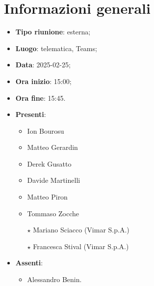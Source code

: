 \section{Informazioni generali}
\begin{itemize}
  \item \textbf{Tipo riunione}: esterna;
  \item \textbf{Luogo}: telematica, Teams;
  \item \textbf{Data}: 2025-02-25;
  \item \textbf{Ora inizio}: 15:00;
  \item \textbf{Ora fine}: 15:45.
  
  \item \textbf{Presenti}:
  \begin{itemize}
    \item Ion Bourosu
    \item Matteo Gerardin
    \item Derek Gusatto
    \item Davide Martinelli
    \item Matteo Piron
    \item Tommaso Zocche
    \item[$\star$] Mariano Sciacco (Vimar S.p.A.)
    \item[$\star$] Francesca Stival (Vimar S.p.A.)
  \end{itemize}

  \item \textbf{Assenti}:
  \begin{itemize}
      \item Alessandro Benin.
  \end{itemize}
 
\end{itemize}